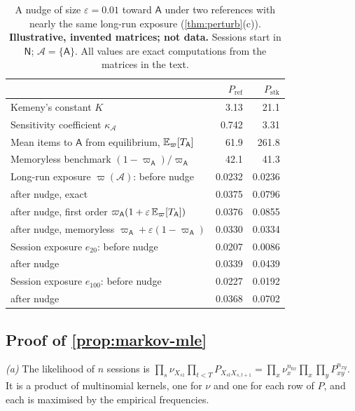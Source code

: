 \begin{table}[htb]
\centering
\caption{A nudge of size $\varepsilon=0.01$ toward $\mathsf A$ under two references with nearly the same long-run exposure (\cref{thm:perturb}(c)). \textbf{Illustrative, invented matrices; not data.} Sessions start in $\mathsf N$; $\mathcal A=\{\mathsf A\}$. All values are exact computations from the matrices in the text.}\label{tab:markov-nudge}
\small
\begin{tabular}{@{}l rr@{}}
\toprule
 & $P_{\mathrm{ref}}$ & $P_{\mathrm{stk}}$ \\
\midrule
Kemeny's constant $K$ & 3.13 & 21.1 \\
Sensitivity coefficient $\kappa_{\mathcal A}$ & 0.742 & 3.31 \\
Mean items to $\mathsf A$ from equilibrium, $\mathbb{E}_\varpi[T_{\mathsf A}]$ & 61.9 & 261.8 \\
Memoryless benchmark $(1-\varpi_{\mathsf A})/\varpi_{\mathsf A}$ & 42.1 & 41.3 \\
Long-run exposure $\varpi(\mathcal A)$: before nudge & 0.0232 & 0.0236 \\
\quad after nudge, exact & 0.0375 & 0.0796 \\
\quad after nudge, first order $\varpi_{\mathsf A}(1+\varepsilon\,\mathbb{E}_\varpi[T_{\mathsf A}])$ & 0.0376 & 0.0855 \\
\quad after nudge, memoryless $\varpi_{\mathsf A}+\varepsilon(1-\varpi_{\mathsf A})$ & 0.0330 & 0.0334 \\
Session exposure $e_{20}$: before nudge & 0.0207 & 0.0086 \\
\quad after nudge & 0.0339 & 0.0439 \\
Session exposure $e_{100}$: before nudge & 0.0227 & 0.0192 \\
\quad after nudge & 0.0368 & 0.0702 \\
\bottomrule
\end{tabular}
\end{table}

\subsection{Proof of \texorpdfstring{\cref{prop:markov-mle}}{the estimation proposition}}\label{app:pf-mle}

\emph{(a)} The likelihood of $n$ sessions is $\prod_s\nu_{X_{s1}}\prod_{t<T}P_{X_{st}X_{s,t+1}}=\prod_x\nu_x^{n_{0x}}\prod_x\prod_yP_{xy}^{n_{xy}}$. It is a product of multinomial kernels, one for $\nu$ and one for each row of $P$, and each is maximised by the empirical frequencies.


